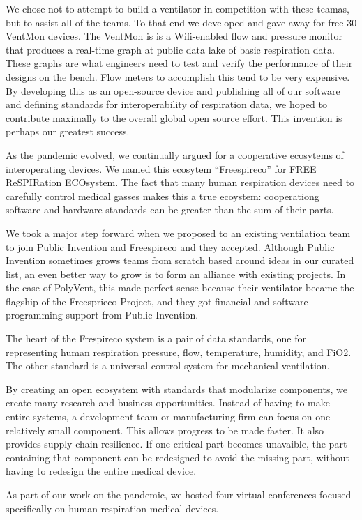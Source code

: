 \documentclass[
	fontsize=10pt, %
	twoside=false, %
	secnumdepth=1, %
]{kaobook}
\begin{document}
We chose not to attempt to build a ventilator in competition with
these teamas, but to assist all of the teams.
To that end we developed and gave away for free 30 VentMon devices.
The VentMon is is a Wifi-enabled flow and pressure monitor that
produces a real-time graph at public data lake of basic respiration
data.
These graphs are what engineers need to test and verify the performance
of their designs on the bench.
Flow meters to accomplish this tend to be very expensive.
By developing this as an open-source device and publishing all of our
software and defining standards for interoperability of respiration
data, we hoped to contribute maximally to the overall global
open source effort. This invention is perhaps our greatest success.

As the pandemic evolved, we continually argued for a cooperative
ecosytems of interoperating devices.
We named this ecosytem ``Freespireco'' for FREE ReSPIRation ECOsystem.
The fact that many human respiration devices need to carefully control
medical gasses makes this a true ecoystem: cooperationg software and
hardware standards can be greater than the sum of their parts.

We took a major step forward when we proposed to an existing
ventilation team to join Public Invention and Freespireco and they accepted.
Although Public Invention sometimes grows teams from scratch
based around ideas in our curated list, an even better way
to grow is to form an alliance with existing projects.
In the case of PolyVent, this made perfect sense because
their ventilator became the flagship of the Freesprieco Project, and
they got financial and software programming support from Public Invention.

The heart of the Frespireco system is a pair of data standards, one for
representing human respiration pressure, flow, temperature, humidity, and
FiO2. The other standard is a universal control system for mechanical ventilation.

By creating an open ecosystem with standards that modularize components,
we create many research and business opportunities. Instead of having to make
entire systems, a development team or manufacturing firm can focus on one
relatively small component. This allows progress to be made faster.
It also provides supply-chain resilience. If one critical part becomes unavaible,
the part containing that component can be redesigned to avoid the missing
part, without having to redesign the entire medical device.

As part of our work on the pandemic, we hosted four virtual conferences
focused specifically on human respiration medical devices.
\end{document}

